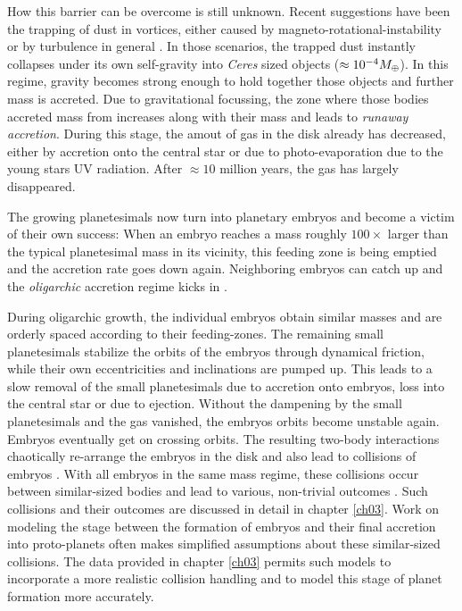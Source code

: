 How this barrier can be overcome is still unknown. Recent suggestions have been the trapping of dust in vortices, either caused by magneto-rotational-instability \citep{Johansen:2007p37} or by turbulence in general \citep{2008ApJ...686.1292I}. In those scenarios, the trapped dust instantly collapses under its own self-gravity into \emph{Ceres} sized objects ($\approx 10^{-4} M_{\oplus}$). In this regime, gravity becomes strong enough to hold together those objects and further mass is accreted. Due to gravitational focussing, the zone where those bodies accreted mass from increases along with their mass and leads to \emph{runaway accretion}. During this stage, the amout of gas in the disk already has decreased, either by accretion onto the central star or due to photo-evaporation due to the young stars UV radiation. After $\approx 10$ million years, the gas has largely disappeared.

The growing planetesimals now turn into planetary embryos and become a victim of their own success: When an embryo reaches a mass roughly $ 100\times$ larger than the typical planetesimal mass in its vicinity, this feeding zone is being emptied and the accretion rate goes down again. Neighboring embryos can catch up and the \emph{oligarchic} accretion regime kicks in \citep{1993Icar..106..210I, 2010ApJ...714L.103O}.

During oligarchic growth, the individual embryos obtain similar masses and are orderly spaced according to their feeding-zones. The remaining small planetesimals stabilize the orbits of the embryos through dynamical friction, while their own eccentricities and inclinations are pumped up. This leads to a slow removal of the small planetesimals due to accretion onto embryos, loss into the central star or due to ejection. Without the dampening by the small planetesimals and the gas vanished, the embryos orbits become unstable again. Embryos eventually get on crossing orbits. The resulting two-body interactions chaotically re-arrange the embryos in the disk and also lead to collisions of embryos \cite{Chambers:2001p2105, Chambers:2004p4098}. With all embryos in the same mass regime, these collisions occur between similar-sized bodies and lead to various, non-trivial outcomes \citep{Asphaug:2010p3539}. Such collisions and their outcomes are discussed in detail in chapter \ref{ch03}. Work on modeling the stage between the formation of embryos and their final accretion into proto-planets \citep{Chambers:2001p2105, 2006Icar..184...39O} often makes simplified assumptions about these similar-sized collisions. The data provided in chapter \ref{ch03} permits such models to incorporate a more realistic collision handling and to model this stage of planet formation more accurately.

